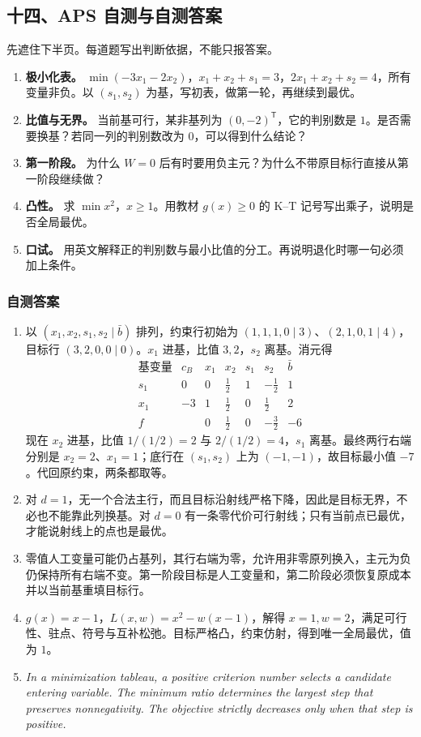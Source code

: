 \documentclass[UTF8,11pt,a4paper]{ctexart}
\begin{document}
\subsection*{十四、APS 自测与自测答案}
\noindent 先遮住下半页。每道题写出判断依据，不能只报答案。
\begin{enumerate}
\item \textbf{极小化表。} $\min(-3x_1-2x_2)$，$x_1+x_2+s_1=3$，$2x_1+x_2+s_2=4$，所有变量非负。以 $(s_1,s_2)$ 为基，写初表，做第一轮，再继续到最优。
\item \textbf{比值与无界。} 当前基可行，某非基列为 $(0,-2)^{\mathsf T}$，它的判别数是 $1$。是否需要换基？若同一列的判别数改为 $0$，可以得到什么结论？
\item \textbf{第一阶段。} 为什么 $W=0$ 后有时要用负主元？为什么不带原目标行直接从第一阶段继续做？
\item \textbf{凸性。} 求 $\min x^2$，$x\ge1$。用教材 $g(x)\ge0$ 的 K--T 记号写出乘子，说明是否全局最优。
\item \textbf{口试。} 用英文解释正的判别数与最小比值的分工。再说明退化时哪一句必须加上条件。
\end{enumerate}

\subsubsection*{自测答案}
\begin{enumerate}
\item 以 $(x_1,x_2,s_1,s_2\mid\bar b)$ 排列，约束行初始为 $(1,1,1,0\mid3)$、$(2,1,0,1\mid4)$，目标行 $(3,2,0,0\mid0)$。$x_1$ 进基，比值 $3,2$，$s_2$ 离基。消元得
\[
\begin{array}{c|r|rrrr|r}
\text{基变量}&c_B&x_1&x_2&s_1&s_2&\bar b\\\hline
s_1&0&0&\frac{1}{2}&1&-\frac{1}{2}&1\\
x_1&-3&1&\frac{1}{2}&0&\frac{1}{2}&2\\
\hline
f&&0&\frac{1}{2}&0&-\frac{3}{2}&-6
\end{array}
\]
现在 $x_2$ 进基，比值 $1/(1/2)=2$ 与 $2/(1/2)=4$，$s_1$ 离基。最终两行右端分别是 $x_2=2$、$x_1=1$；底行在 $(s_1,s_2)$ 上为 $(-1,-1)$，故目标最小值 $-7$。代回原约束，两条都取等。
\item 对 $d=1$，无一个合法主行，而且目标沿射线严格下降，因此是目标无界，不必也不能靠此列换基。对 $d=0$ 有一条零代价可行射线；只有当前点已最优，才能说射线上的点也是最优。
\item 零值人工变量可能仍占基列，其行右端为零，允许用非零原列换入，主元为负仍保持所有右端不变。第一阶段目标是人工变量和，第二阶段必须恢复原成本并以当前基重填目标行。
\item $g(x)=x-1$，$L(x,w)=x^2-w(x-1)$，解得 $x=1,w=2$，满足可行性、驻点、符号与互补松弛。目标严格凸，约束仿射，得到唯一全局最优，值为 $1$。
\item \textit{In a minimization tableau, a positive criterion number selects a candidate entering variable. The minimum ratio determines the largest step that preserves nonnegativity. The objective strictly decreases only when that step is positive.}
\end{enumerate}
\clearpage
\end{document}
